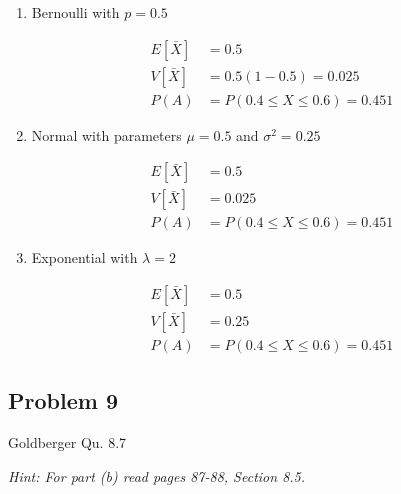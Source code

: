 \documentclass{article}
\newcommand{\1}{\mathbf{1}}
\begin{document}
\begin{enumerate}
    \item Bernoulli with $p=0.5$
    
    \begin{align*}
        E[\bar X] &= 0.5 \\
        V[\bar X] &= 0.5(1-0.5) = 0.025 \\
        P(A) &= P(0.4\leq X \leq 0.6) = 0.451
    \end{align*}
    
    \item Normal with parameters $\mu=0.5$ and $\sigma^2=0.25$
    
    \begin{align*}
        E[\bar X] &= 0.5 \\
        V[\bar X] &= 0.025 \\
        P(A) &= P(0.4\leq X \leq 0.6) = 0.451
    \end{align*}
    
    \item Exponential with $\lambda=2$
    
    \begin{align*}
        E[\bar X] &= 0.5 \\
        V[\bar X] &= 0.25 \\
        P(A) &= P(0.4\leq X \leq 0.6) = 0.451
    \end{align*}
\end{enumerate}

\newpage
\subsection*{Problem 9}
Goldberger Qu. 8.7\par
{\it Hint: For part (b) read pages 87-88, Section 8.5.}
\end{document}
